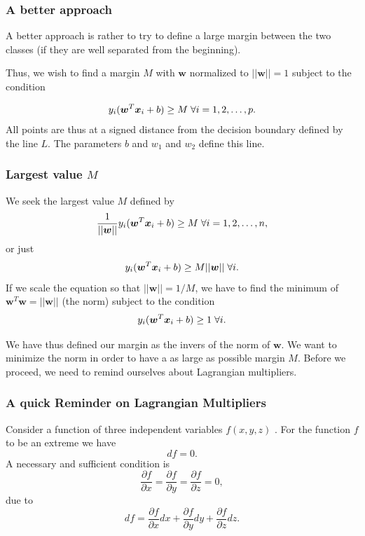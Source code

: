 \documentclass{beamer}
\begin{document}
\begin{frame}
\frametitle{A better approach}

A better approach is rather to try to define a large margin between
the two classes (if they are well separated from the beginning).

Thus, we wish to find a margin $M$ with $\bm{w}$ normalized to
$\vert\vert \bm{w}\vert\vert =1$ subject to the condition

\[
y_i(\bm{w}^T\bm{x}_i+b) \geq M \hspace{0.1cm}\forall i=1,2,\dots, p. 
\]
All points are thus at a signed distance from the decision boundary defined by the line $L$. The parameters $b$ and $w_1$ and $w_2$ define this line.
\end{frame}

\begin{frame}
\frametitle{Largest value $M$}

We seek the largest value $M$ defined by
\[
\frac{1}{\vert \vert \bm{w}\vert\vert}y_i(\bm{w}^T\bm{x}_i+b) \geq M \hspace{0.1cm}\forall i=1,2,\dots, n, 
\]
or just 
\[
y_i(\bm{w}^T\bm{x}_i+b) \geq M\vert \vert \bm{w}\vert\vert \hspace{0.1cm}\forall i. 
\]
If we scale the equation so that $\vert \vert \bm{w}\vert\vert = 1/M$, we have to find the minimum of 
$\bm{w}^T\bm{w}=\vert \vert \bm{w}\vert\vert$ (the norm) subject to the condition
\[
y_i(\bm{w}^T\bm{x}_i+b) \geq 1 \hspace{0.1cm}\forall i.
\]

We have thus defined our margin as the invers of the norm of
$\bm{w}$. We want to minimize the norm in order to have a as large as
possible margin $M$. Before we proceed, we need to remind ourselves
about Lagrangian multipliers.
\end{frame}

\begin{frame}
\frametitle{A quick Reminder on Lagrangian Multipliers}

Consider a function of three independent variables $f(x,y,z)$ . For the function $f$ to be an
extreme we have
\[
df=0.
\]
A necessary and sufficient condition is
\[
\frac{\partial f}{\partial x} =\frac{\partial f}{\partial y}=\frac{\partial f}{\partial z}=0,
\]
due to
\[
df = \frac{\partial f}{\partial x}dx+\frac{\partial f}{\partial y}dy+\frac{\partial f}{\partial z}dz.
\]
\end{frame}
\end{document}
